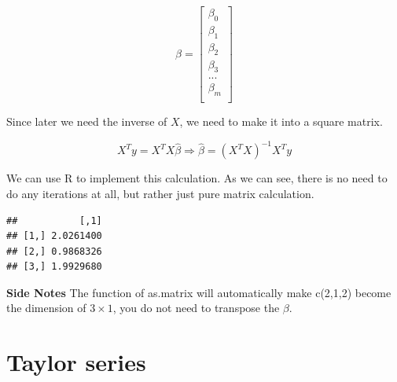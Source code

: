 \documentclass[]{book}
\newenvironment{Shaded}{\begin{snugshade}}{\end{snugshade}}
\newcommand{\CommentTok}[1]{\textcolor[rgb]{0.56,0.35,0.01}{\textit{#1}}}
\newcommand{\DataTypeTok}[1]{\textcolor[rgb]{0.13,0.29,0.53}{#1}}
\newcommand{\DecValTok}[1]{\textcolor[rgb]{0.00,0.00,0.81}{#1}}
\newcommand{\KeywordTok}[1]{\textcolor[rgb]{0.13,0.29,0.53}{\textbf{#1}}}
\newcommand{\NormalTok}[1]{#1}
\newcommand{\OperatorTok}[1]{\textcolor[rgb]{0.81,0.36,0.00}{\textbf{#1}}}
\begin{document}
\[\beta = \begin{bmatrix}\beta_0 \\
\beta_1 \\
\beta_2 \\
\beta_3 \\
...\\
\beta_m \\
\end{bmatrix}\]

Since later we need the inverse of \(X\), we need to make it into a square matrix.

\[X^Ty=X^TX \hat{\beta} \Rightarrow \hat{\beta} = (X^TX)^{-1} X^Ty\]

We can use R to implement this calculation. As we can see, there is no need to do any iterations at all, but rather just pure matrix calculation.

\begin{Shaded}
\end{Shaded}

\begin{verbatim}
##           [,1]
## [1,] 2.0261400
## [2,] 0.9868326
## [3,] 1.9929680
\end{verbatim}

\textbf{Side Notes}
The function of as.matrix will automatically make c(2,1,2) become the dimension of \(3 \times 1\), you do not need to transpose the \(\beta\).

\hypertarget{taylor-series}{%
\section{Taylor series}\label{taylor-series}}
\end{document}
